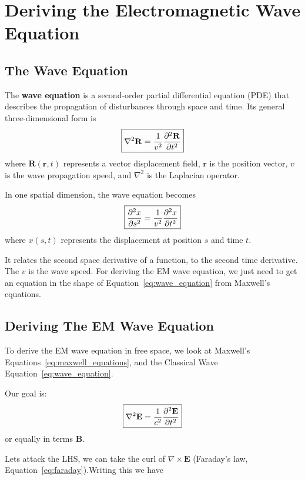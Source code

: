 \section{Deriving the Electromagnetic Wave Equation}

\subsection{The Wave Equation}
The \textbf{wave equation} is a second-order partial
differential equation (PDE) that describes the propagation
of disturbances through space and time. Its general
three-dimensional form is
\begin{equation}
\boxed{
\nabla^2 \mathbf{R} =
\frac{1}{v^2}\pdv[2]{\mathbf{R}}{t}
}
\label{eq:wave_equation}
\end{equation}
where $\mathbf{R}(\mathbf{r},t)$ represents a vector
displacement field, $\mathbf{r}$ is the position vector,
$v$ is the wave propagation speed, and $\nabla^2$
is the Laplacian operator.

In one spatial dimension, the wave equation becomes
\begin{equation}
\boxed{
\pdv[2]{x}{s} =
\frac{1}{v^2}\pdv[2]{x}{t}
}
\label{eq:wave_equation_1d}
\end{equation}
where $x(s,t)$ represents the displacement at position
$s$ and time $t$.

It relates the second space derivative of a function, to the second time derivative. The $v$ is the wave speed. For deriving the EM wave equation, we just need to get an equation in the shape of Equation~\ref{eq:wave_equation} from Maxwell's equations. 


\subsection{Deriving The EM Wave Equation}


To derive the EM wave equation in free space, we look at Maxwell's Equations~\ref{eq:maxwell_equations}, and the Classical Wave Equation~\ref{eq:wave_equation}.

Our goal is:
\begin{equation}
\boxed{
\nabla^2 \mathbf{E} =
\frac{1}{c^2}\pdv[2]{\mathbf{E}}{t}
}
\label{eq:wave_equation}
\end{equation}
or equally in terms $\mathbf{B}$.

Lets attack the LHS, we can take the curl of $\nabla \times \mathbf{E}$ (Faraday's law, Equation~\ref{eq:faraday}).Writing this we have

